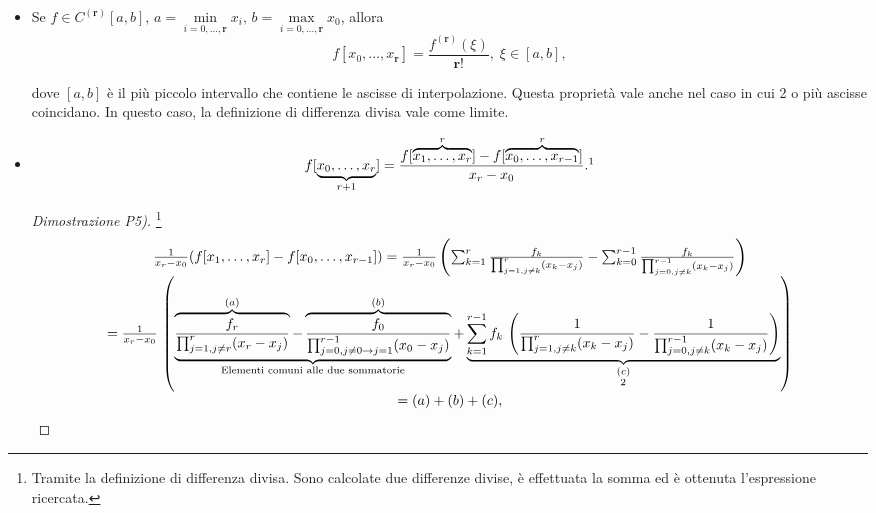 \begin{property}
\begin{itemize}
		\item[P4)] Se $f\in C^{(\boldsymbol r)}[a,b],\, a=\underset{i=0,\hdots,\boldsymbol r}{\min}x_i,\, b=\underset{i=0,\hdots,\boldsymbol r}{\max}x_0$, allora
		\begin{equation}\label{eq:P4DiffDiv}
			f[x_0,\hdots, x_{\boldsymbol r}]=\frac{f^{(\boldsymbol r)}(\xi)}{\boldsymbol r!},\; \xi\in [a,b],
		\end{equation}
		
		dove $[a,b]$ è il più piccolo intervallo che contiene le ascisse di interpolazione. Questa proprietà vale anche nel caso in cui 2 o più ascisse coincidano. In questo caso, la definizione di differenza divisa vale come limite.
		
		\item[P5)] \begin{equation}\label{eq:P5_differenze_divise}
			f[\underbrace{x_0,\hdots,x_r}_{r+1}]=\frac{f[\overbrace{x_1,\hdots,x_r}^{r}]-f[\overbrace{x_0,\hdots,x_{r-1}}^{r}]}{x_r-x_0}.\footnotemark
		\end{equation}
		\begin{proof}[Dimostrazione P5)] \footnote{Tramite la definizione di differenza divisa. Sono calcolate due differenze divise, è effettuata la somma ed è ottenuta l'espressione ricercata.}
			\begin{equation}\label{eq:dimPropDiffDiv}
				\begin{matrix}
					\frac{1}{x_r-x_0}(f[x_1,\hdots, x_r]-f[x_0,\hdots,x_{r-1}]) = \frac{1}{x_r-x_0}\left(\sum_{k=1}^r\frac{f_k}{\prod_{j=1,j\neq k}^r(x_k-x_j)}-\sum_{k=0}^{r-1}\frac{f_k}{\prod_{j=0,j\neq k}^{r-1}(x_k-x_j)}\right)\\
					= \frac{1}{x_r-x_0}\,\left(\underbrace{\overbrace{\frac{f_r}{\prod_{j=1,j\neq r}^r(x_r-x_j)}}^{(a)}-\overbrace{\frac{f_0}{\prod_{j=0,j\neq 0\rightarrow j=1}^{r-1}(x_0-x_j)}}^{(b)}}_{\text{Elementi comuni alle due sommatorie}}+\underbrace{\sum_{k=1}^{r-1}f_k\,\left(\frac{1}{\prod_{j=1,j\neq k}^r(x_k-x_j)}-\frac{1}{\prod_{j=0,j\neq k}^{r-1}(x_k-x_j)}\right)}_{\underset{\footnotemark}{(c)}}\right)\\
					=(a)+(b)+(c),
				\end{matrix}

\end{equation}
\end{proof}
\end{itemize}
\end{property}
